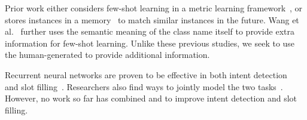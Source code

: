 Prior work either considers few-shot learning in a metric learning framework~\cite{koch2015siamese,vinyals2016matching}, or stores
instances in a memory~\cite{santoro2016meta, kaiser2017learning} to match similar instances in the future.
Wang et al.~ further uses the semantic meaning of the class name itself to provide extra information for few-shot
learning. Unlike these previous studies, we seek to use the human-generated \REs to provide additional information.

 Recurrent neural networks are proven to be effective in both intent
detection~\cite{ravuri2015comparative} and slot filling~\cite{mesnil2015using}.
Researchers also find ways to jointly model the two tasks~\cite{liu2016attention, zhang2016joint}. However, no work so far has combined
\REs and \NNs to improve intent detection and slot filling. %
